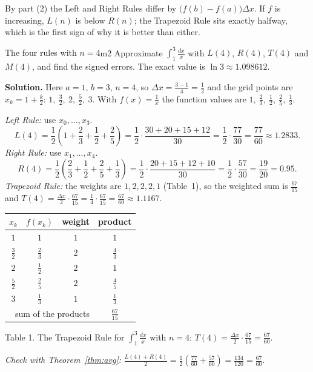 \documentclass[11pt]{article}
\begin{document}
By part (2) the Left and Right Rules differ by $\big(f(b)-f(a)\big)\Delta x$. If $f$ is increasing, $L(n)$ is below $R(n)$; the Trapezoid Rule sits exactly halfway, which is the first sign of why it is better than either.

\begin{exmp}{The four rules with $n=4$}{m2}
Approximate $\displaystyle\int_1^3\frac{dx}x$ with $L(4)$, $R(4)$, $T(4)$ and $M(4)$, and find the signed errors. The exact value is $\ln3\approx1.098612$.

\textbf{Solution.} Here $a=1$, $b=3$, $n=4$, so $\Delta x=\frac{3-1}4=\frac12$ and the grid points are $x_k=1+\frac k2$: $1,\ \frac32,\ 2,\ \frac52,\ 3$. With $f(x)=\frac1x$ the function values are $1,\ \frac23,\ \frac12,\ \frac25,\ \frac13$.

\emph{Left Rule:} use $x_0,\ldots,x_3$.
\[L(4)=\frac12\left(1+\frac23+\frac12+\frac25\right)=\frac12\cdot\frac{30+20+15+12}{30}=\frac12\cdot\frac{77}{30}=\frac{77}{60}\approx1.2833.\]
\emph{Right Rule:} use $x_1,\ldots,x_4$.
\[R(4)=\frac12\left(\frac23+\frac12+\frac25+\frac13\right)=\frac12\cdot\frac{20+15+12+10}{30}=\frac12\cdot\frac{57}{30}=\frac{19}{20}=0.95.\]
\emph{Trapezoid Rule:} the weights are $1,2,2,2,1$ (Table~1), so the weighted sum is $\frac{67}{15}$ and $T(4)=\frac{\Delta x}2\cdot\frac{67}{15}=\frac14\cdot\frac{67}{15}=\frac{67}{60}\approx1.1167$.
\begin{center}
\begin{tabular}{cccc}
\toprule $x_k$ & $f(x_k)$ & weight & product\\\midrule
$1$ & $1$ & $1$ & $1$\\
$\frac32$ & $\frac23$ & $2$ & $\frac43$\\
$2$ & $\frac12$ & $2$ & $1$\\
$\frac52$ & $\frac25$ & $2$ & $\frac45$\\
$3$ & $\frac13$ & $1$ & $\frac13$\\\midrule
\multicolumn{3}{r}{sum of the products} & $\frac{67}{15}$\\\bottomrule
\end{tabular}
\end{center}
\begin{center}\small Table 1. The Trapezoid Rule for $\int_1^3\frac{dx}x$ with $n=4$: $T(4)=\frac{\Delta x}2\cdot\frac{67}{15}=\frac{67}{60}$.\end{center}
\emph{Check with Theorem~\ref{thm:avg}:} $\frac{L(4)+R(4)}2=\frac12\left(\frac{77}{60}+\frac{57}{60}\right)=\frac{134}{120}=\frac{67}{60}$.


\end{exmp}
\end{document}
